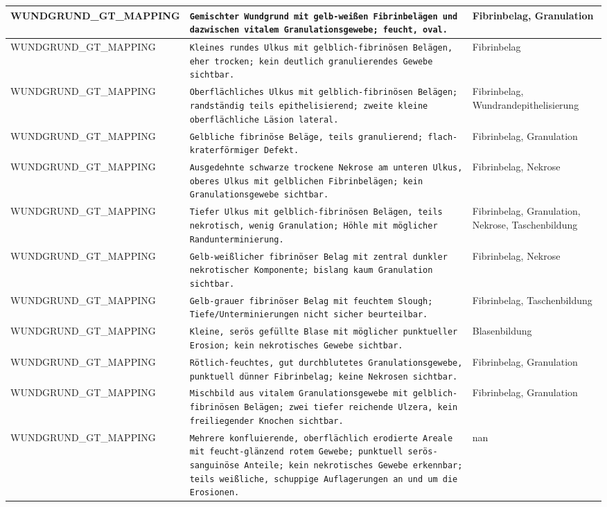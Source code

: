 \begin{longtable}{|p{3.5cm}|p{5cm}|p{6.5cm}|}
WUNDGRUND\_GT\_MAPPING & \texttt{Gemischter Wundgrund mit gelb-weißen Fibrinbelägen und dazwischen vitalem Granulationsgewebe; feucht, oval.} & Fibrinbelag, Granulation \\ \hline
WUNDGRUND\_GT\_MAPPING & \texttt{Kleines rundes Ulkus mit gelblich-fibrinösen Belägen, eher trocken; kein deutlich granulierendes Gewebe sichtbar.} & Fibrinbelag \\ \hline
WUNDGRUND\_GT\_MAPPING & \texttt{Oberflächliches Ulkus mit gelblich-fibrinösen Belägen; randständig teils epithelisierend; zweite kleine oberflächliche Läsion lateral.} & Fibrinbelag, Wundrandepithelisierung \\ \hline
WUNDGRUND\_GT\_MAPPING & \texttt{Gelbliche fibrinöse Beläge, teils granulierend; flach-kraterförmiger Defekt.} & Fibrinbelag, Granulation \\ \hline
WUNDGRUND\_GT\_MAPPING & \texttt{Ausgedehnte schwarze trockene Nekrose am unteren Ulkus, oberes Ulkus mit gelblichen Fibrinbelägen; kein Granulationsgewebe sichtbar.} & Fibrinbelag, Nekrose \\ \hline
WUNDGRUND\_GT\_MAPPING & \texttt{Tiefer Ulkus mit gelblich-fibrinösen Belägen, teils nekrotisch, wenig Granulation; Höhle mit möglicher Randunterminierung.} & Fibrinbelag, Granulation, Nekrose, Taschenbildung \\ \hline
WUNDGRUND\_GT\_MAPPING & \texttt{Gelb-weißlicher fibrinöser Belag mit zentral dunkler nekrotischer Komponente; bislang kaum Granulation sichtbar.} & Fibrinbelag, Nekrose \\ \hline
WUNDGRUND\_GT\_MAPPING & \texttt{Gelb-grauer fibrinöser Belag mit feuchtem Slough; Tiefe/Unterminierungen nicht sicher beurteilbar.} & Fibrinbelag, Taschenbildung \\ \hline
WUNDGRUND\_GT\_MAPPING & \texttt{Kleine, serös gefüllte Blase mit möglicher punktueller Erosion; kein nekrotisches Gewebe sichtbar.} & Blasenbildung \\ \hline
WUNDGRUND\_GT\_MAPPING & \texttt{Rötlich-feuchtes, gut durchblutetes Granulationsgewebe, punktuell dünner Fibrinbelag; keine Nekrosen sichtbar.} & Fibrinbelag, Granulation \\ \hline
WUNDGRUND\_GT\_MAPPING & \texttt{Mischbild aus vitalem Granulationsgewebe mit gelblich-fibrinösen Belägen; zwei tiefer reichende Ulzera, kein freiliegender Knochen sichtbar.} & Fibrinbelag, Granulation \\ \hline
WUNDGRUND\_GT\_MAPPING & \texttt{Mehrere konfluierende, oberflächlich erodierte Areale mit feucht-glänzend rotem Gewebe; punktuell serös-sanguinöse Anteile; kein nekrotisches Gewebe erkennbar; teils weißliche, schuppige Auflagerungen an und um die Erosionen.} & nan \\ \hline

\end{longtable}
